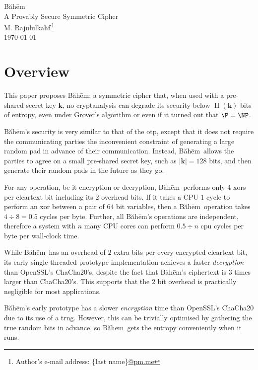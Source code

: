 \documentclass[twocolumn,hidelinks]{article}
\newcommand{\baheem}{Băhēm}
\DeclareMathOperator{\entropy}{H}
\begin{document}
\begin{center}
    \Huge
    \baheem\\
    \Large
    A Provably Secure Symmetric Cipher\\
    \normalsize
    \vspace{0.5em}
    M. Rajululkahf\,\footnote{Author's e-mail address: \{last
    name\}\url{@pm.me}}\\
    \vspace{0.5em}
    \footnotesize
    \today\\
\end{center}

\section*{Overview}
This paper proposes \baheem;  a symmetric cipher that, when used with a
pre-shared secret key $\mathbf{k}$, no cryptanalysis can degrade its
security below $\entropy(\mathbf{k})$ bits of entropy, even under Grover's
algorithm \cite{10.1145/237814.237866} or even if it turned out that $\P =
\NP$.

\baheem's security is very similar to that of the \gls{otp}, except that it
does not require the communicating parties the inconvenient constraint of
generating a large random pad in advance of their communication. Instead,
\baheem\ allows the parties to agree on a small pre-shared secret key, such
as $|\mathbf{k}| = 128$ bits, and then generate their random pads in the
future as they go.

For any operation, be it encryption or decryption, \baheem\ performs only
$4$ \glspl{xor} per cleartext bit including its $2$ overhead bits.  If it
takes a CPU $1$ cycle to perform an \gls{xor} between a pair of $64$ bit
variables, then a \baheem\ operation takes $4 \div 8 = 0.5$ cycles
per byte.  Further, all \baheem's operations are independent, therefore a
system with $n$ many CPU cores can perform $0.5 \div n$ cpu cycles per byte
per wall-clock time.

While \baheem\ has an overhead of $2$ extra bits per every encrypted
cleartext bit, its early single-threaded prototype implementation achieves
a faster \emph{decryption} than OpenSSL's ChaCha20's, despite the fact that
\baheem's ciphertext is $3$ times larger than ChaCha20's.  This supports
that the $2$ bit overhead is practically negligible for most applications.

\baheem's early prototype has a slower \emph{encryption} time than
OpenSSL's ChaCha20 due to its use of a \gls{trng}.  However, this can be
trivially optimised by gathering the true random bits in advance, so
\baheem\ gets the entropy conveniently when it runs.
\end{document}
